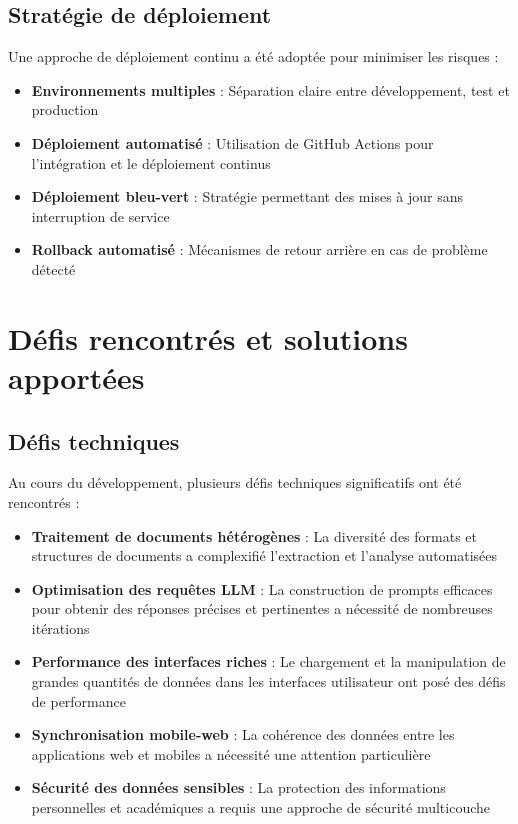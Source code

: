 \subsection{Stratégie de déploiement}

Une approche de déploiement continu a été adoptée pour minimiser les risques :

\begin{itemize}
  \item \textbf{Environnements multiples} : Séparation claire entre développement, test et production
  
  \item \textbf{Déploiement automatisé} : Utilisation de GitHub Actions pour l'intégration et le déploiement continus
  
  \item \textbf{Déploiement bleu-vert} : Stratégie permettant des mises à jour sans interruption de service
  
  \item \textbf{Rollback automatisé} : Mécanismes de retour arrière en cas de problème détecté
\end{itemize}

\section{Défis rencontrés et solutions apportées}

\subsection{Défis techniques}

Au cours du développement, plusieurs défis techniques significatifs ont été rencontrés :

\begin{itemize}
  \item \textbf{Traitement de documents hétérogènes} : La diversité des formats et structures de documents a complexifié l'extraction et l'analyse automatisées
  
  \item \textbf{Optimisation des requêtes LLM} : La construction de prompts efficaces pour obtenir des réponses précises et pertinentes a nécessité de nombreuses itérations
  
  \item \textbf{Performance des interfaces riches} : Le chargement et la manipulation de grandes quantités de données dans les interfaces utilisateur ont posé des défis de performance
  
  \item \textbf{Synchronisation mobile-web} : La cohérence des données entre les applications web et mobiles a nécessité une attention particulière
  
  \item \textbf{Sécurité des données sensibles} : La protection des informations personnelles et académiques a requis une approche de sécurité multicouche
\end{itemize}

